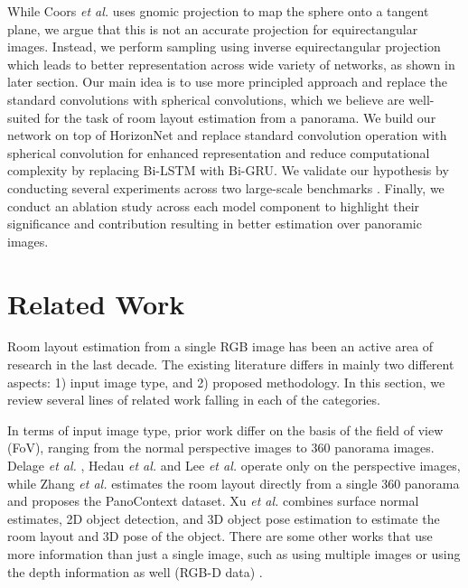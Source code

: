 \documentclass[final]{cvpr}
\begin{document}
While Coors \textit{et al.} \cite{coors2018spherenet} uses gnomic projection to map the sphere onto a tangent plane, we argue that this is not an accurate projection for equirectangular images. Instead, we perform sampling using inverse equirectangular projection which leads to better representation across wide variety of networks, as shown in later section. Our main idea is to use more principled approach and replace the standard convolutions with spherical convolutions, which we believe are well-suited for the task of room layout estimation from a panorama. We build our network on top of HorizonNet \cite{sun2019horizonnet} and replace standard convolution operation with spherical convolution for enhanced representation and reduce computational complexity by replacing Bi-LSTM with Bi-GRU. We validate our hypothesis by conducting several experiments across two large-scale benchmarks \cite{zhang2014panocontext, armeni2017joint}. Finally, we conduct an ablation study across each model component to highlight their significance and contribution resulting in better estimation over panoramic images. 



\section{Related Work}\label{sec:related work}


Room layout estimation from a single RGB image has been an active area of research in the last decade. The existing literature differs in mainly two different aspects: 1) input image type, and 2) proposed methodology. In this section, we review several lines of
related work falling in each of the categories.




In terms of input image type, prior work differ on the basis of the field of view (FoV), ranging from the normal perspective images to 360 panorama images. Delage \textit{et al.} \cite{delage2006dynamic},  Hedau \textit{et al.} \cite{hedau2009recovering} and Lee \textit{et al.} \cite{lee2009geometric} operate only on the perspective images, while Zhang \textit{et al.} \cite{zhang2014panocontext} estimates the room layout directly from a single 360 panorama and proposes the PanoContext dataset. Xu \textit{et al.} \cite{xu2017pano2cad} combines surface normal estimates, 2D object detection, and 3D object pose estimation to estimate the room layout and 3D pose of the object. There are some other works that use more information than just a single image, such as using multiple images \cite{cabral2014piecewise} or using the depth information as well (RGB-D data) \cite{liu2016layered, guo2015predicting, zhang2013estimating}.
\end{document}
